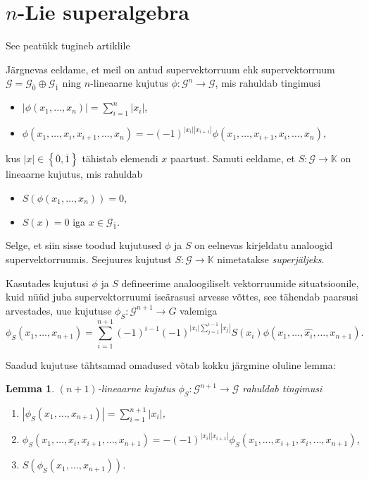 \documentclass[12pt,a4paper]{article}
\theoremstyle{plain}
\newtheorem{lemma}[thm]{Lemma}
\theoremstyle{definition}
\newcommand{\K}{\mathbb{K}}
\newcommand{\G}{\mathcal{G}}
\newcommand{\col}{\colon}
\newcommand{\arr}{\rightarrow}
\begin{document}

\section{\texorpdfstring{$n$}\ -Lie superalgebra}

See peatükk tugineb artiklile \cite{Abramov:2014}

Järgnevas eeldame, et meil on antud supervektorruum
ehk supervektorruum $\G = \G_{\overline{0}} \oplus \G_{\overline{1}}$
ning $n$-lineaarne kujutus $\phi \col \G^n \arr \G$, mis rahuldab
tingimusi
\begin{itemize}
    \item $| \phi(x_1, \dots, x_n) | = \sum_{i=1}^n |x_i|$,
    \item $ \phi \left( x_1, \dots, x_i, x_{i+1}, \dots, x_n \right) =
            -(-1)^{ |x_i| |x_{i+1}| } \phi \left(
                x_1, \dots, x_{i+1}, x_i, \dots, x_n \right), $
\end{itemize}
kus $|x| \in \left\{ \overline{0}, \overline{1} \right\}$
tähistab elemendi $x$ paartust. Samuti eeldame, et $S \col \G \arr \K$
on lineaarne kujutus, mis rahuldab
\begin{itemize}
    \item $S \left( \phi \left( x_1, \dots, x_n \right) \right) = 0$,
    \item $S(x) = 0$ iga $x \in \G_{\overline{1}}$.
\end{itemize}

Selge, et siin sisse toodud kujutused $\phi$ ja $S$ on eelnevas
kirjeldatu analoogid supervektorruumis. Seejuures kujutust $S \col \G \arr \K$
nimetatakse \emph{superjäljeks}.

Kasutades kujutusi $\phi$ ja $S$ defineerime analoogiliselt
vektorruumide situatsioonile, kuid nüüd juba supervektorruumi iseärasusi
arvesse võttes, see tähendab paarsusi arvestades, uue kujutuse
$\phi_S \col \G^{n+1} \arr G$ valemiga
\[
    \phi_S (x_1, \dots, x_{n+1}) =
    \sum_{i=1}^{n+1} (-1)^{i-1}(-1)^{|x_i| \sum_{j=1}^{i-1} |x_j| }
        S(x_i) \phi \left(
            x_1, \dots, \hat{x_i}, \dots, x_{n+1}
        \right).
\]

Saadud kujutuse tähtsamad omadused võtab kokku järgmine oluline lemma:

\begin{lemma}
    $(n+1)$-lineaarne kujutus $\phi_S \col \G^{n+1} \arr \G$
    rahuldab tingimusi
    \begin{enumerate}
        \item $ | \phi_S \left(x_1, \dots, x_{n+1} \right) | =
               \sum_{i=1}^{n+1} |x_i| $,
        \item $ \phi_S \left(x_1, \dots, x_i, x_{i+1}, \dots, x_{n+1} \right) =
               -(-1)^{|x_i| |x_{i+1}|} \phi_S \left(
                    x_1, \dots, x_{i+1}, x_i, \dots, x_{n+1}
                \right) $,
        \item $S \left( \phi_S \left( x_1, \dots, x_{n+1} \right) \right)$.
    \end{enumerate}
\end{lemma}
\end{document}
